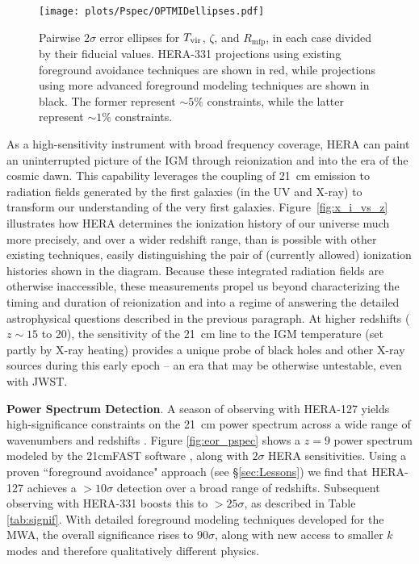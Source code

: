 \documentclass[preprint]{aastex}
\newcommand{\Mycitep}[1]{{\bf \citep{#1}}}
\newcommand{\compress}{\vspace{-0.25in}}
\newcommand{\Caption}[4]{\vspace{#1}\renewcommand{\baselinestretch}{#2}\caption{#4}\vspace{#3}}
\begin{document}
\begin{figure*}[t]\centering
\texttt{[image: plots/Pspec/OPTMIDellipses.pdf]}
\Caption{-0.3in}{0.99}{-0.15in}{\small
Pairwise $2\sigma$ error ellipses for $T_{\rm vir}$, $\zeta$, and $R_\textrm{mfp}$, in each case divided by their fiducial values.  HERA-331 projections using existing foreground avoidance techniques are shown in red, while projections using more advanced foreground modeling techniques are shown in black.  The former represent $\sim 5\%$ constraints, while the latter represent $\sim 1\%$ constraints.\label{fig:ErrorEllipses}}
\end{figure*}


As a high-sensitivity instrument with broad frequency coverage, HERA can
paint an uninterrupted picture of the IGM through reionization and into the era of the cosmic dawn.
This capability leverages the coupling of
21~cm emission to radiation fields generated by the first galaxies (in the UV and X-ray) to transform our understanding of the very first galaxies.
Figure~\ref{fig:x_i_vs_z} illustrates how HERA
determines the ionization history of our universe much more precisely,
and over a wider redshift range, than is possible with other existing techniques, easily distinguishing the pair of (currently allowed) ionization histories shown in the diagram.
Because these integrated radiation fields are otherwise inaccessible, these measurements propel us beyond characterizing the timing and duration of reionization and into a regime
of answering the detailed astrophysical questions described in the previous paragraph.
At higher redshifts ($z \sim 15$ to 20), the sensitivity of the 21~cm line
to the IGM temperature (set partly by X-ray heating) provides a unique probe of black holes and other X-ray sources during this early epoch -- an era that may be otherwise
untestable, even with JWST.


{\bf Power Spectrum Detection}. A season of observing with HERA-127 yields high-significance constraints on the 21~cm power
spectrum across a wide range of wavenumbers and redshifts \Mycitep{pober_et_al2014}.  
Figure \ref{fig:eor_pspec} shows a $z=9$ power spectrum modeled by the 21cmFAST software \Mycitep{mesinger_et_al2011},
along with $2\sigma$ HERA sensitivities.  Using a proven ``foreground avoidance" approach (see \S\ref{sec:Lessons})
we find that
HERA-127 achieves a $> 10\sigma$ detection over a broad range of redshifts.
Subsequent observing with HERA-331 boosts this to $>25\sigma$, as described in Table \ref{tab:signif}.  With detailed foreground modeling techniques
developed for the MWA, the overall significance rises to $90\sigma$,
along with new access to smaller $k$ modes and therefore qualitatively different physics.
\end{document}
